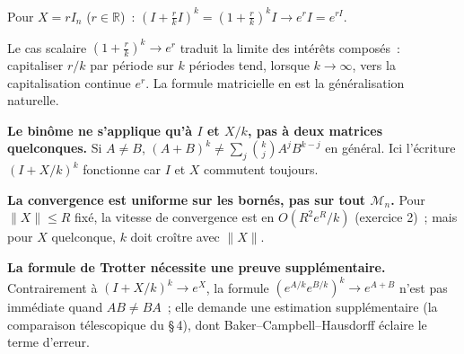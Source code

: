
\begin{mdframed}[style=exbar]
  Pour $X = rI_n$ ($r \in \mathbb{R}$)~:
  $\left(I + \frac{r}{k}I\right)^k = \left(1+\frac{r}{k}\right)^k I \to e^r I = e^{rI}$.

  Le cas scalaire $\left(1+\frac{r}{k}\right)^k \to e^r$ traduit la limite
  des intérêts composés~: capitaliser $r/k$ par période sur $k$ périodes
  tend, lorsque $k\to\infty$, vers la capitalisation continue $e^r$.
  La formule matricielle en est la généralisation naturelle.
\end{mdframed}

\decsep{}



\begin{mdframed}[style=cexbar]
  \textbf{Le binôme ne s'applique qu'à $I$ et $X/k$, pas à deux matrices
  quelconques.}\enspace{}
  Si $A \neq B$, ${(A+B)}^k \neq \sum_j\binom{k}{j}A^j B^{k-j}$ en général.
  Ici l'écriture ${(I + X/k)}^k$ fonctionne car $I$ et $X$ commutent toujours.

  \smallskip\noindent
  \textbf{La convergence est uniforme sur les bornés, pas sur tout
  $\mathcal{M}_n$.}\enspace
  Pour $\|X\| \leq R$ fixé, la vitesse de convergence est en
  $O(R^2 e^R/k)$ (exercice 2)~; mais pour $X$ quelconque, $k$ doit
  croître avec $\|X\|$.

  \smallskip\noindent
  \textbf{La formule de Trotter nécessite une preuve supplémentaire.}\enspace
  Contrairement à ${(I+X/k)}^k \to e^X$, la formule
  ${(e^{A/k}e^{B/k})}^k \to e^{A+B}$ n'est pas immédiate quand $AB \neq BA$~;
  elle demande une estimation supplémentaire (la comparaison télescopique
  du §\,4), dont Baker--Campbell--Hausdorff éclaire le terme d'erreur.
\end{mdframed}

\vspace{6pt}
\exolabel{}

